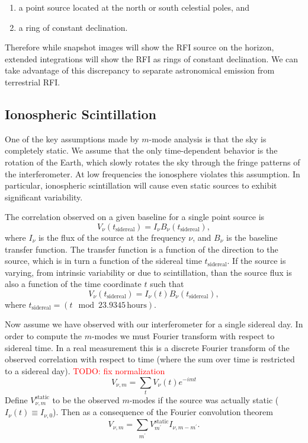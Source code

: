 \documentclass[twocolumn]{aastex6}
\newcommand{\todo}[1]{\textcolor{red}{TODO: #1}\PackageWarning{TODO:}{#1!}}
\begin{document}
\begin{enumerate}
    \item a point source located at the north or south celestial poles, and
    \item a ring of constant declination.
\end{enumerate}

Therefore while snapshot images will show the RFI source on the horizon, extended integrations will
show the RFI as rings of constant declination. We can take advantage of this discrepancy to separate
astronomical emission from terrestrial RFI.




\subsection{Ionospheric Scintillation}

One of the key assumptions made by $m$-mode analysis is that the sky is completely static.  We
assume that the only time-dependent behavior is the rotation of the Earth, which slowly rotates the
sky through the fringe patterns of the interferometer. At low frequencies the ionosphere violates
this assumption. In particular, ionospheric scintillation will cause even static sources to exhibit
significant variability.

The correlation observed on a given baseline for a single point source is
\begin{equation}
    V_\nu(t_{\textrm{sidereal}}) = I_\nu B_\nu(t_{\textrm{sidereal}}),
\end{equation}
where $I_\nu$ is the flux of the source at the frequency $\nu$, and $B_\nu$
is the baseline transfer function. The transfer function is a function of
the direction to the source, which is in turn a function of the sidereal
time $t_{\textrm{sidereal}}$. If the source is varying, from intrinsic
variability or due to scintillation, than the source flux is also a function
of the time coordinate $t$ such that
\begin{equation}
    V_\nu(t_{\textrm{sidereal}}) = I_\nu(t) B_\nu(t_{\textrm{sidereal}}),
\end{equation}
where $t_{\textrm{sidereal}} = (t \mod 23.9345\,\textrm{hours})$.

Now assume we have observed with our interferometer for a single sidereal day.
In order to compute the $m$-modes we must Fourier transform with respect to
sidereal time. In a real measurement this is a discrete Fourier transform of
the observed correlation with respect to time (where the sum over time is
restricted to a sidereal day). \todo{fix normalization}
\begin{equation}
    V_{\nu, m} = \sum_{t} V_\nu(t) e^{-imt}
\end{equation}
Define $V_{\nu, m}^{\textrm{static}}$ to be the observed $m$-modes if the source
was actually static ($I_\nu(t) \equiv I_{\nu,0}$). Then as a consequence of the
Fourier convolution theorem
\begin{equation}
    V_{\nu, m} = \sum_{m^\prime} V_{m^\prime}^\textrm{static} I_{\nu, m-m^\prime}.
\end{equation}
\end{document}

